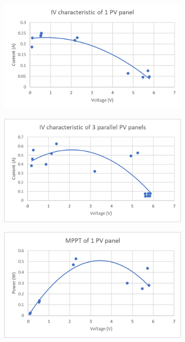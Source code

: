 \begin{figure}
    \centering
    \begin{subfigure}[b]{.45\linewidth}
        \includegraphics[width=\linewidth]{images/iv-1.png}
    \end{subfigure}
    \begin{subfigure}[b]{.45\linewidth}
        \includegraphics[width=\linewidth]{images/iv-3.png}
    \end{subfigure}
    \begin{subfigure}[b]{.45\linewidth}
        \includegraphics[width=\linewidth]{images/mppt-1.png}

\end{subfigure}
\end{figure}
